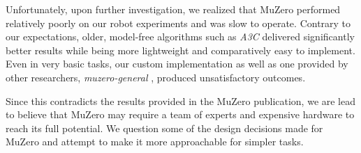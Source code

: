 Unfortunately, upon further investigation, we realized that MuZero performed relatively poorly on our robot experiments and was slow to operate. Contrary to our expectations, older, model-free algorithms such as \textit{A3C} \cite{a3c} delivered significantly better results while being more lightweight and comparatively easy to implement. Even in very basic tasks, our custom implementation as well as one provided by other researchers, \textit{muzero-general} \cite{muzero-general}, produced unsatisfactory outcomes.

Since this contradicts the results provided in the MuZero publication, we are lead to believe that MuZero may require a team of experts and expensive hardware to reach its full potential. We question some of the design decisions made for MuZero and attempt to make it more approachable for simpler tasks.